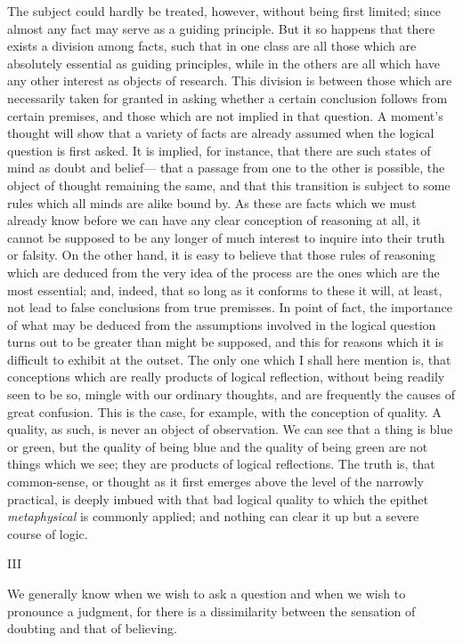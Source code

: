 \documentclass[]{article}
\newcommand{\itemsection}[1]{\bigskip\centerline{#1}\nopagebreak}
\begin{document}
The subject could hardly be treated, however, without being first limited; since almost any fact may serve as a guiding principle. But it so happens that there exists a division among facts, such that in one class are all those which are absolutely essential as guiding principles, while in the others are all which have any other interest as objects of research. This division is between those which are necessarily taken for granted in asking whether a certain conclusion follows from certain premises, and those which are not implied in that question. A moment's thought will show that a variety of facts are already assumed when the logical question is first asked. It is implied, for instance, that there are such states of mind as doubt and belief--- that a passage from one to the other is possible, the object of thought remaining the same, and that this transition is subject to some rules which all minds are alike bound by. As these are facts which we must already know before we can have any clear conception of reasoning at all, it cannot be supposed to be any longer of much interest to inquire into their truth or falsity. On the other hand, it is easy to believe that those rules of reasoning which are deduced from the very idea of the process are the ones which are the most essential; and, indeed, that so long as it conforms to these it will, at least, not lead to false conclusions from true premisses. In point of fact, the importance of what may be deduced from the assumptions involved in the logical question turns out to be greater than might be supposed, and this for reasons which it is difficult to exhibit at the outset. The only one which I shall here mention is, that conceptions which are really products of logical reflection, without being readily seen to be so, mingle with our ordinary thoughts, and are frequently the causes of great confusion. This is the case, for example, with the conception of quality. A quality, as such, is never an object of observation. We can see that a thing is blue or green, but the quality of being blue and the quality of being green are not things which we see; they are products of logical reflections. The truth is, that common-sense, or thought as it first emerges above the level of the narrowly practical, is deeply imbued with that bad logical quality to which the epithet \emph{metaphysical} is commonly applied; and nothing can clear it up but a severe course of logic.

\itemsection{III}

We generally know when we wish to ask a question and when we wish to pronounce a judgment, for there is a dissimilarity between the sensation of doubting and that of believing.
\end{document}
